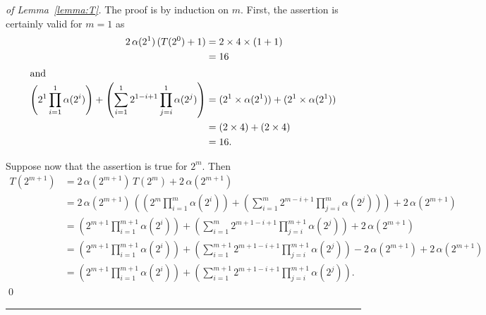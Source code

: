 \documentclass[a4paper,10pt]{llncs}
\newcommand{\horiz}{{\centering\rule{350pt}{.4pt}}}
\begin{document}
\begin{proof}[of Lemma~\ref{lemma:T}]
The proof is by induction on $m$.
First, the assertion is certainly valid for $m = 1$ as
\begin{align*}
2\,\alpha(2^1)\,(T(2^0) + 1)
&= 
2\times 4 \times (1 + 1) 
\\
&=
16
\\
\intertext{and}
\left(
2^1 \prod_{i=1}^{1} \alpha(2^{i})
\right)
+
\left(
\sum_{i=1}^{1}
2^{1-i+1} \prod_{j=i}^{1} \alpha(2^{j})
\right)
&= (2^1 \times \alpha(2^1)) + (2^1 \times \alpha(2^1))
\\
&=
(2 \times 4) + (2 \times 4) 
\\
&=
16\text{.}
\end{align*}

Suppose now that the assertion is true for $2^m$.
Then
\begin{align*}
T(2^{m+1})
&=
2\,\alpha(2^{m+1})\,T(2^{m}) + 2\,\alpha(2^{m+1})
\\
&=
2\,\alpha(2^{m+1})\,
\left(
\left(
2^m \prod_{i=1}^{m} \alpha(2^{i})
\right)
+
\left(
\sum_{i=1}^{m}
2^{m-i+1} \prod_{j=i}^{m} \alpha(2^{j})
\right)
\right)
 + 2\,\alpha(2^{m+1})
 \\
&=
\left(
2^{m+1} \prod_{i=1}^{m+1} \alpha(2^{i})
\right)
+
\left(
\sum_{i=1}^{m}
2^{m+1-i+1} \prod_{j=i}^{m+1} \alpha(2^{j})
\right)
 + 2\,\alpha(2^{m+1})
 \\ 
&=
\left(
2^{m+1} \prod_{i=1}^{m+1} \alpha(2^{i})
\right)
+
\left(
\sum_{i=1}^{m+1}
2^{m+1-i+1} \prod_{j=i}^{m+1} \alpha(2^{j})
\right)
- 2\,\alpha(2^{m+1}) 
+ 2\,\alpha(2^{m+1})
 \\
&=
\left(
2^{m+1} \prod_{i=1}^{m+1} \alpha(2^{i})
\right)
+
\left(
\sum_{i=1}^{m+1}
2^{m+1-i+1} \prod_{j=i}^{m+1} \alpha(2^{j})
\right)\text{.} 
\end{align*}
\qed
\end{proof}

\horiz
\end{document}
